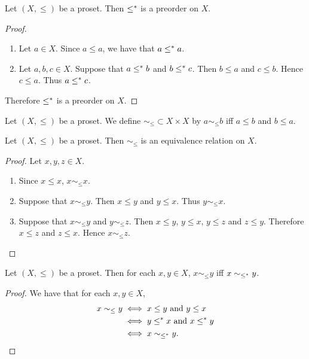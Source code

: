 \documentclass{book}
\begin{document}
	\begin{ex} 
		Let $(X, \leq)$ be a proset. Then $\leq^*$ is a preorder on $X$.
	\end{ex}
	
	\begin{proof}\
		\begin{enumerate}
			\item Let $a \in X$. Since $a \leq a$, we have that $a \leq^* a$. 
			\item Let $a,b,c \in X$. Suppose that $a \leq^* b$ and $b \leq^* c$. Then $b \leq a$ and $c \leq b$. Hence $c \leq a$. Thus $a \leq^* c$. 
		\end{enumerate}
		Therefore $\leq^*$ is a preorder on $X$. 
	\end{proof}
	
	\begin{defn} 
		Let $(X, \leq)$ be a proset. We define $\sim_{\leq} \subset X \times X$ by $a \sim_{\leq} b$ iff $a \leq b$ and $b \leq a$.
	\end{defn}
	
	\begin{ex} 
		Let $(X, \leq)$ be a proset. Then $\sim_{\leq}$ is an equivalence relation on $X$.
	\end{ex}
	
	\begin{proof}
		Let $x,y, z \in X$. 
		\begin{enumerate}
			\item Since $x \leq x$, $x \sim_{\leq} x$.
			\item Suppose that $x \sim_{\leq} y$. Then $x \leq y$ and $y \leq x$. Thus $y \sim_{\leq} x$. 
			\item Suppose that $x \sim_{\leq} y$ and $y \sim_{\leq} z$. Then $x \leq y$, $y \leq x$, $y \leq z$ and $z \leq y$. Therefore $x \leq z$ and $z \leq x$. Hence $x \sim_{\leq} z$.  
		\end{enumerate}
	\end{proof}
	
	\begin{ex} 
		Let $(X, \leq)$ be a proset. Then for each $x,y \in X$, $x \sim_{\leq} y$ iff $x \sim_{\leq^*} y$.
	\end{ex}
	
	\begin{proof}
		We have that for each $x,y \in X$,
		\begin{align*}
			x \sim_{\leq} y
			& \iff \text{$x \leq y$ and $y \leq x$} \\
			& \iff \text{$y \leq^* x$ and $x \leq^* y$} \\
			& \iff x \sim_{\leq^*} y.
		\end{align*}
	\end{proof}
	
\end{document}

